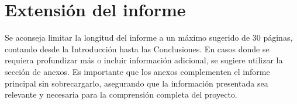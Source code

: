 \chapter{Extensión del informe}
Se aconseja limitar la longitud del informe a un máximo sugerido de 30 páginas, contando desde la Introducción hasta las Conclusiones. En casos donde se requiera profundizar más o incluir información adicional, se sugiere utilizar la sección de anexos. Es importante que los anexos complementen el informe principal sin sobrecargarlo, asegurando que la información presentada sea relevante y necesaria para la comprensión completa del proyecto. 
